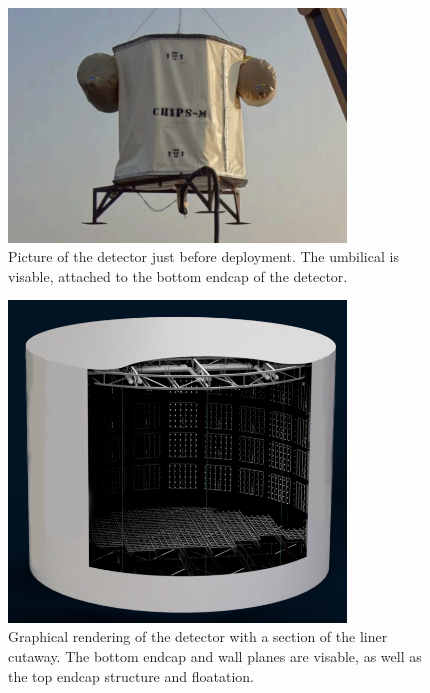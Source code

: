\begin{figure}
    \includegraphics[width=0.8\textwidth]{diagrams/4-chips/chips_m.png}
    \caption[Picture of the \chipsm detector.]
    {Picture of the \chipsm detector just before deployment. The umbilical is visable, attached to the
        bottom endcap of the detector.}
    \label{fig:chips_m}
\end{figure}

\begin{figure}
    \includegraphics[width=0.8\textwidth]{diagrams/4-chips/chips_render_1.png}
    \caption[Graphical rendering of the \chipsfive detector with liner cutaway.]
    {Graphical rendering of the \chipsfive detector with a section of the liner cutaway.
        The bottom endcap and wall planes are visable,
        as well as the top endcap structure and floatation.}
    \label{fig:chips_render_1}
\end{figure}

